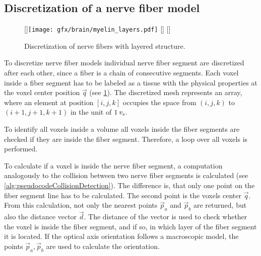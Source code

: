 \subsection{Discretization of a nerve fiber model}
%
\begin{figure}[!t]
\centering
\setlength{\tikzwidth}{0.3\textwidth}
[\tikzwidth]{\texttt{[image: gfx/brain/myelin\_layers.pdf]}\vspace{0mm}}\hfill
{}
[\tikzwidth]{\vspace{-5mm}}\hfill
{}
[\tikzwidth]{\vspace{-5mm}}
\caption{Discretization of nerve fibers with layered structure.}
\label{fig:fiber_discretization}
\end{figure}
%
To discretize nerve fiber models individual nerve fiber segment are discretized after each other, since a fiber is a chain of consecutive segments.
Each voxel inside a fiber segment has to be labeled as a tissue with the physical properties at the voxel center position $\vec{q}$ (see \cref{fig:fiber_discretization}).
The discretized mesh represents an array, where an element at position $[i,j,k]$ occupies the space from $(i,j,k)$ to $(i+1,j+1,k+1)$ in the unit of $\SI{1}{\textnormal{$\mathit{v_{s}}$}}$.
\par
%
To identify all voxels inside a volume all voxels inside the fiber segments are checked if they are inside the fiber segment.
Therefore, a loop over all voxels is performed.
\par
%
To calculate if a voxel is inside the nerve fiber segment,
a computation analogously to the collision between two nerve fiber segments is calculated (see \cref{alg:pseudocodeCollisionDetection}).
The difference is, that only one point on the fiber segment line has to be calculated.
The second point is the voxels center $\vec{q}$.
From this calculation, not only the nearest points $\vec{p}_a$ and $\vec{p}_b$ are returned, but also the distance vector $\vec{d}$.
The distance of the vector is used to check whether the voxel is inside the fiber segment, and if so, in which layer of the fiber segment it is located.
If the optical axis orientation follows a macroscopic model, the points $\vec{p}_a, \vec{p}_b$ are used to calculate the orientation.
